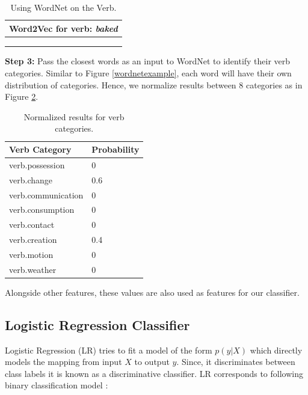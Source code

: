 \documentclass[11pt]{article}
\begin{document}
\begin{table}[h!]
\centering
\begin{tabular}{ | m{30em} |}
\hline
Word2Vec for verb: \textit{baked} \\
\hline
["unbaked", 0.602738618850708]\\
\hline
["cooked", 0.6022148728370667]\\
\hline
["bakes", 0.5771548748016357]\\
\hline
\end{tabular}
\caption{Using WordNet on the Verb.}
\label{word2vecexample}
\end{table}

\textbf{Step 3:} Pass the closest words as an input to WordNet to identify their verb categories. Similar to Figure \ref{wordnetexample}, each word will have their own distribution of categories. Hence, we normalize results between 8 categories as in Figure \ref{normalized}.

\begin{table}[h!]
\centering
\begin{tabular}{ | m{20em} | m{5em} |}
\hline
\textbf{Verb Category} & \textbf{Probability} \\
\hline
verb.possession & 0\\
\hline
verb.change & 0.6\\
\hline
verb.communication & 0\\
\hline
verb.consumption & 0\\
\hline
verb.contact & 0\\
\hline
verb.creation & 0.4\\
\hline
verb.motion & 0\\
\hline
verb.weather & 0\\
\hline
\end{tabular}
\caption{Normalized results for verb categories.}
\label{normalized}
\end{table}

Alongside other features, these values are also used as features for our classifier.

\subsection{Logistic Regression Classifier}\label{sec:logisticregressionclassifier}

Logistic Regression (LR) tries to fit a model of the form \begin{math} p(y|X) \end{math} which directly models the mapping from input \begin{math}X\end{math} to output \begin{math}y\end{math}. Since, it discriminates between class labels it is known as a discriminative classifier. LR corresponds to following binary classification model \citep{Murphy}:
\end{document}
